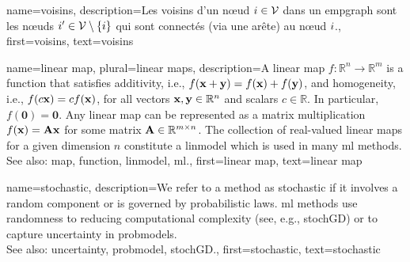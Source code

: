 

{
	name={voisins},
	description={Les voisins d’un nœud $i \in \mathcal{V}$ dans un \gls{empgraph} 
		sont les nœuds $i' \in \mathcal{V} \setminus \{ i\}$ qui sont connectés (via une arête) au nœud $i$.},
	first={voisins},
	text={voisins}
}


{name={linear map}, plural={linear maps}, 
	description={A linear \gls{map} $f: \mathbb{R}^n \rightarrow \mathbb{R}^m$ is a \gls{function} that satisfies additivity, i.e.,
		$f({\bf x} + {\bf y}) = f({\bf x}) + f({\bf y})$, and homogeneity, i.e.,
		$f(c{\bf x}) = c f({\bf x})$, for all vectors ${\bf x}, {\bf y} \in \mathbb{R}^n$ and scalars $c \in \mathbb{R}$. 
		In particular, $f(\mathbf{0}) = \mathbf{0}$. Any linear \gls{map} can be represented as a matrix 
		multiplication $f({\bf x}) = {\bf A} {\bf x}$ for some matrix ${\bf A} \in \mathbb{R}^{m \times n}$. 
		The collection of real-valued linear \glspl{map} for a given dimension $n$ constitute a \gls{linmodel} 
		which is used in many \gls{ml} methods.\\
		See also: \gls{map}, \gls{function}, \gls{linmodel}, \gls{ml}.},
	first={linear map},
	text={linear map}
}

{name={stochastic},
	description={We refer to a  method as stochastic if it involves a random component 
		or is governed by probabilistic laws. \Gls{ml} methods use randomness to reducing 
		computational complexity (see, e.g., \gls{stochGD}) or to capture \gls{uncertainty} in \glspl{probmodel}. 
		\\
		See also: \gls{uncertainty}, \gls{probmodel}, \gls{stochGD}.},
	first={stochastic},
	text={stochastic}
}

